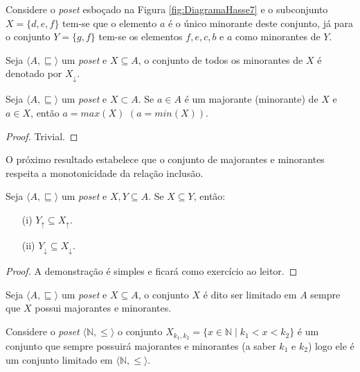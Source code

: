 \begin{exemplo}
	Considere o \textit{poset} esboçado na Figura \ref{fig:DiagramaHasse7} e o subconjunto $X = \{d, e, f\}$ tem-se que o elemento $a$ é o único minorante deste conjunto, já para o conjunto $Y = \{g, f\}$ tem-se os elementos $f, e, c, b$ e $a$ como minorantes de $Y$.
\end{exemplo}

\begin{definicao}\label{def:ConjuntoDosMjnorantes}
	Seja $\langle A, \sqsubseteq \rangle$ um \textit{poset} e $X \subseteq A$, o conjunto de todos os minorantes de $X$ é denotado por $X_\downarrow$.
\end{definicao}

\begin{teorema}
	Seja $\langle A, \sqsubseteq \rangle$ um \textit{poset} e $X \subset A$. Se $a \in A$ é um majorante (minorante) de $X$ e $a \in X$, então $a = max(X)$ $(a = min(X))$.
\end{teorema}

\begin{proof}
	Trivial.
\end{proof}

O próximo resultado estabelece que o conjunto de majorantes e minorantes respeita a monotonicidade da relação inclusão.

\begin{teorema}\label{teo:MonotonicidadeMajoranteMinorante}
	Seja $\langle A, \sqsubseteq \rangle$ um \textit{poset} e $X, Y \subseteq A$. Se $X \subseteq Y$, então: 
	\begin{itemize}
		\item[(i)] $Y_\uparrow \subseteq X_\uparrow$.
		\item[(ii)] $Y_\downarrow \subseteq X_\downarrow$.
	\end{itemize}
\end{teorema}

\begin{proof}
	A demonstração é simples e ficará como exercício ao leitor. 
\end{proof}

\begin{definicao}\label{def:ConjuntoLimitadoPoset}
	Seja $\langle A, \sqsubseteq \rangle$ um \textit{poset} e $X \subseteq A$, o conjunto $X$ é dito ser limitado em $A$ sempre que $X$ possui majorantes e minorantes.
\end{definicao}

\begin{exemplo}
	Considere o \textit{poset} $\langle \mathbb{N}, \leq \rangle$ o conjunto $X_{k_1, k_2} = \{x \in \mathbb{N} \mid k_1 < x < k_2\}$ é um conjunto que sempre possuirá majorantes e minorantes (a saber $k_1$ e $k_2$) logo ele é um conjunto limitado em $\langle \mathbb{N}, \leq \rangle$.
\end{exemplo}

